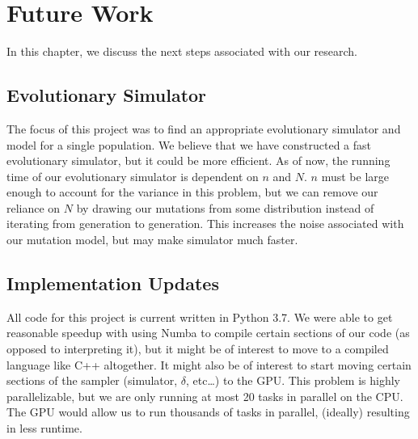 \chapter{Future Work}\label{ch:futureWork}
In this chapter, we discuss the next steps associated with our research.

\section{Evolutionary Simulator}\label{sec:evolutionarySimulator}
The focus of this project was to find an appropriate evolutionary simulator and model for a single population.
We believe that we have constructed a fast evolutionary simulator, but it could be more efficient.
As of now, the running time of our evolutionary simulator is dependent on $n$ and $N$.
$n$ must be large enough to account for the variance in this problem, but we can remove our reliance on $N$ by
drawing our mutations from some distribution instead of iterating from generation to generation.
This increases the noise associated with our mutation model, but may make simulator much faster.

\section{Implementation Updates}\label{sec:implementationUpdates}
All code for this project is current written in Python 3.7.
We were able to get reasonable speedup with using Numba to compile certain sections of our code (as opposed to
interpreting it), but it might be of interest to move to a compiled language like C++ altogether.
It might also be of interest to start moving certain sections of the sampler (simulator, $\delta$, etc\ldots) to the
GPU.
This problem is highly parallelizable, but we are only running at most 20 tasks in parallel on the CPU.
The GPU would allow us to run thousands of tasks in parallel, (ideally) resulting in less runtime.

